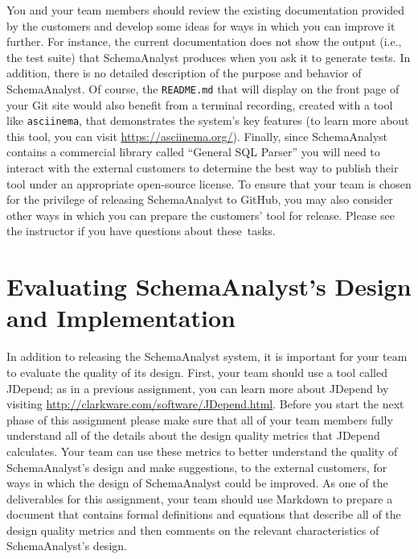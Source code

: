 You and your team members should review the existing documentation provided by the customers and develop some ideas for
ways in which you can improve it further. For instance, the current documentation does not show the output (i.e., the
test suite) that SchemaAnalyst produces when you ask it to generate tests. In addition, there is no detailed description
of the purpose and behavior of SchemaAnalyst. Of course, the {\tt README.md} that will display on the front page of your
Git site would also benefit from a terminal recording, created with a tool like {\tt asciinema}, that demonstrates the
system's key features (to learn more about this tool, you can visit \url{https://asciinema.org/}). Finally, since
SchemaAnalyst contains a commercial library called ``General SQL Parser'' you will need to interact with the external
customers to determine the best way to publish their tool under an appropriate open-source license. To ensure that your
team is chosen for the privilege of releasing SchemaAnalyst to GitHub, you may also consider other ways in
which you can prepare the customers' tool for release. Please see the instructor if you have questions about \mbox{these
tasks}.

\section*{Evaluating SchemaAnalyst's Design and Implementation}

In addition to releasing the SchemaAnalyst system, it is important for your team to evaluate the quality of its design.
First, your team should use a tool called JDepend; as in a previous assignment, you can learn more about JDepend by
visiting \url{http://clarkware.com/software/JDepend.html}.  Before you start the next phase of this assignment please
make sure that all of your team members fully understand all of the details about the design quality metrics that
JDepend calculates.  Your team can use these metrics to better understand the quality of SchemaAnalyst's design and
make suggestions, to the external customers, for ways in which the design of SchemaAnalyst could be improved. As one of
the deliverables for this assignment, your team should use Markdown to prepare a document that contains formal
definitions and equations that describe all of the design quality metrics and then comments on the relevant
characteristics of SchemaAnalyst's design.

